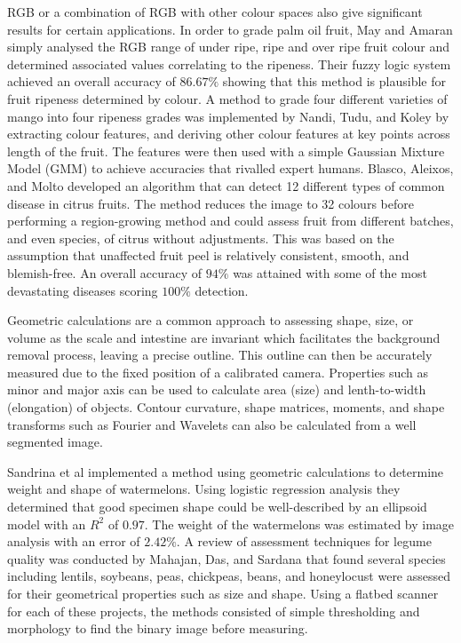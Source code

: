 \documentclass[fleqn,twoside,12pt]{report}
\begin{document}
RGB or a combination of RGB with other colour spaces also give significant results for certain applications. In order to grade palm oil fruit, May and Amaran \cite{may} simply analysed the RGB range of under ripe, ripe and over ripe fruit colour and determined associated values correlating to the ripeness. Their fuzzy logic system achieved an overall accuracy of $86.67\%$ showing that this method is plausible for fruit ripeness determined by colour. A method to grade four different varieties of mango into four ripeness grades was implemented by Nandi, Tudu, and Koley \cite{nandi} by extracting colour features, and deriving other colour features at key points across length of the fruit. The features were then used with a simple Gaussian Mixture Model (GMM) to achieve accuracies that rivalled expert humans. Blasco, Aleixos, and Molto \cite{blasco2} developed an algorithm that can detect 12 different types of common disease in citrus fruits. The method reduces the image to 32 colours before performing a region-growing method and could assess fruit from different batches, and even species, of citrus without adjustments. This was based on the assumption that unaffected fruit peel is relatively consistent, smooth, and blemish-free. An overall accuracy of $94\%$ was attained with some of the most devastating diseases scoring $100\%$ detection. 

Geometric calculations are a common approach to assessing shape, size, or volume as the scale and intestine are invariant which facilitates the background removal process, leaving a precise outline. This outline can then be accurately measured due to the fixed position of a calibrated camera. Properties such as minor and major axis can be used to calculate area (size) and lenth-to-width (elongation) of objects. Contour curvature, shape matrices, moments, and shape transforms such as Fourier and Wavelets can also be calculated from a well segmented image. 

Sandrina et al \cite{sandrina} implemented a method using geometric calculations to determine weight and shape of watermelons. Using logistic regression analysis they determined that good specimen shape could be well-described by an ellipsoid model with an $R^2$ of $0.97$. The weight of the watermelons was estimated by image analysis with an error of $2.42\%$. A review of assessment techniques for legume quality was conducted by Mahajan, Das, and Sardana \cite{mahajan} that found several species including lentils, soybeans, peas, chickpeas, beans, and honeylocust were assessed for their geometrical properties such as size and shape. Using a flatbed scanner for each of these projects, the methods consisted of simple thresholding and morphology to find the binary image before measuring. 
\end{document}
